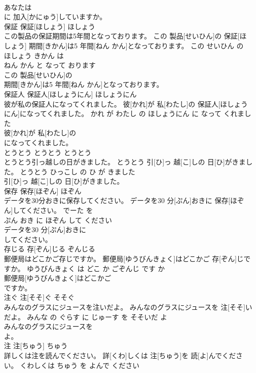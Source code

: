 \documentclass[8pt]{extreport}
\begin{document}
\begin{CJK}{UTF8}{min}
\\	あなたは
\\	に 加入[かにゅう]していますか。			
\\	保証	保証[ほしょう]	ほしょう	
\\	この製品の保証期間は5年間となっております。	この 製品[せいひん]の 保証[ほしょう] 期間[きかん]は5 年間[ねん かん]となっております。	この せいひん の ほしょう きかん は 
\\	ねん かん と なって おります	
\\	この 製品[せいひん]の
\\	期間[きかん]は5 年間[ねん かん]となっております。			
\\	保証人	保証人[ほしょうにん]	ほしょうにん	
\\	彼が私の保証人になってくれました。	彼[かれ]が 私[わたし]の 保証人[ほしょうにん]になってくれました。	かれ が わたし の ほしょうにん に なって くれました	
\\	彼[かれ]が 私[わたし]の
\\	になってくれました。			
\\	とうとう	とうとう	とうとう	
\\	とうとう引っ越しの日がきました。	とうとう 引[ひ]っ 越[こ]しの 日[ひ]がきました。	とうとう ひっこし の ひ が きました	
\\	引[ひ]っ 越[こ]しの 日[ひ]がきました。			
\\	保存	保存[ほぞん]	ほぞん	
\\	データを30分おきに保存してください。	データを30 分[ぷん]おきに 保存[ほぞん]してください。	でーた を 
\\	ぷん おき に ほぞん して ください	
\\	データを30 分[ぷん]おきに
\\	してください。			
\\	存じる	存[ぞん]じる	ぞんじる	
\\	郵便局はどこかご存じですか。	郵便局[ゆうびんきょく]はどこかご 存[ぞん]じですか。	ゆうびんきょく は どこ か ごぞんじ です か	
\\	郵便局[ゆうびんきょく]はどこかご
\\	ですか。			
\\	注ぐ	注[そそ]ぐ	そそぐ	
\\	みんなのグラスにジュースを注いだよ。	みんなのグラスにジュースを 注[そそ]いだよ。	みんな の ぐらす に じゅーす を そそいだ よ	
\\	みんなのグラスにジュースを
\\	よ。			
\\	注	注[ちゅう]	ちゅう	
\\	詳しくは注を読んでください。	詳[くわ]しくは 注[ちゅう]を 読[よ]んでください。	くわしくは ちゅう を よんで ください	

\end{CJK}
\end{document}
